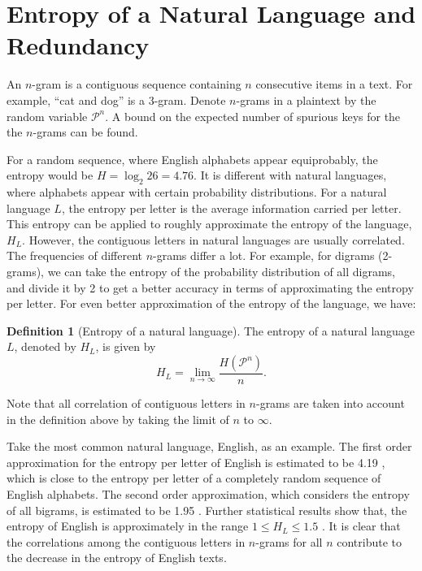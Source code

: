 \documentclass[letterpaper, 10 pt, conference]{ieeeconf}  %
\theoremstyle{definition}
\newtheorem{definition}{Definition}[section]
\theoremstyle{property}
\begin{document}
\section{Entropy of a Natural Language and Redundancy}

An $n$-gram is a contiguous sequence containing $n$ consecutive items in a text. For example, ``cat and dog'' is a 3-gram. Denote $n$-grams in a plaintext by the random variable $\mathcal{P}^n$. A bound on the expected number of spurious keys for the the $n$-grams can be found.

For a random sequence, where English alphabets appear equiprobably, the entropy would be $H = \log_2 26 = 4.76$. It is different with natural languages, where alphabets appear with certain probability distributions. For a natural language $L$, the entropy per letter is the average information carried per letter. This entropy can be applied to roughly approximate the entropy of the language, $H_L$. However, the contiguous letters in natural languages are usually correlated. The frequencies of different $n$-grams differ a lot. For example, for digrams (2-grams), we can take the entropy of the probability distribution of all digrams, and divide it by 2 to get a better accuracy in terms of approximating the entropy per letter. For even better approximation of the entropy of the language, we have:

\begin{definition}[Entropy of a natural language]
\label{def:entropy_lang}
The entropy of a natural language $L$, denoted by $H_L$, is given by $$H_L = \lim_{n\rightarrow \infty}\frac{H(\mathcal{P}^n)}{n}.$$
\end{definition}

Note that all correlation of contiguous letters in $n$-grams are taken into account in the definition above by taking the limit of $n$ to $\infty$.

Take the most common natural language, English, as an example. The first order approximation for the entropy per letter of English is estimated to be 4.19 \cite{basisofredundancy,shankar1997shannon}, which is close to the entropy per letter of a completely random sequence of English alphabets. The second order approximation, which considers the entropy of all bigrams, is estimated to be 1.95 \cite{basisofredundancy,shankar1997shannon}. Further statistical results show that, the entropy of English is approximately in the range $1\leq H_L\leq 1.5$ \cite{basisofredundancy, shannonnote, shankar1997shannon}. It is clear that the correlations among the contiguous letters in $n$-grams for all $n$ contribute to the decrease in the entropy of English texts. 
\end{document}
